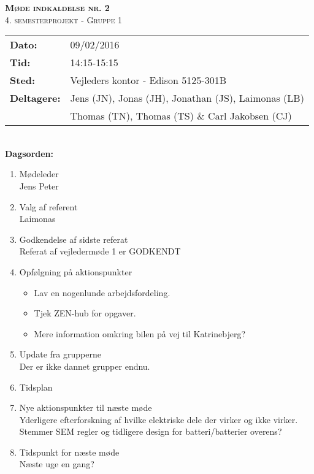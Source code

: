 
\newcommand{\HRule}{\rule{\linewidth}{0.1mm}}


	\begin{center}
		{\huge \bfseries \textsc{Møde indkaldelse nr. 2}}\\
		\textsc{\large 4. semesterprojekt - Gruppe 1}\\[0.3cm]
	\end{center}
	\begin{tabular}{ll}
	\large \textbf{Dato:} & 09/02/2016  \\ %
	\large \textbf{Tid:}  & 14:15-15:15 \\ %
	\large \textbf{Sted:} & Vejleders kontor - Edison 5125-301B		\\ %
	\large \textbf{Deltagere:} & Jens (JN), Jonas (JH), Jonathan (JS), Laimonas (LB) \\
	\large \textbf & Thomas (TN),  Thomas (TS) \& Carl Jakobsen (CJ)\\
	\end{tabular}\\
	\phantom{\,}\hspace{0.1em} \large \textbf{Dagsorden:}
	\begin{enumerate}
		\itemsep 0.3em 
		\item Mødeleder\\
			Jens Peter
		\item Valg af referent\\
			Laimonas
		\item Godkendelse af sidste referat\\
			Referat af vejledermøde 1 er GODKENDT
		\item Opfølgning på aktionspunkter
		\begin{itemize}
			\itemsep 0.3em 
			\item Lav en nogenlunde arbejdsfordeling.
			\item Tjek ZEN-hub for opgaver.
			\item Mere information omkring bilen på vej til Katrinebjerg?
		\end{itemize}
		\item Update fra grupperne\\
			Der er ikke dannet grupper endnu.
		\item Tidsplan
		\item Nye aktionspunkter til næste møde\\
			Yderligere efterforskning af hvilke elektriske dele der virker og ikke virker.
			Stemmer SEM regler og tidligere design for batteri/batterier overens?
		\item Tidspunkt for næste møde\\
			Næste uge en gang?
	\end{enumerate}
